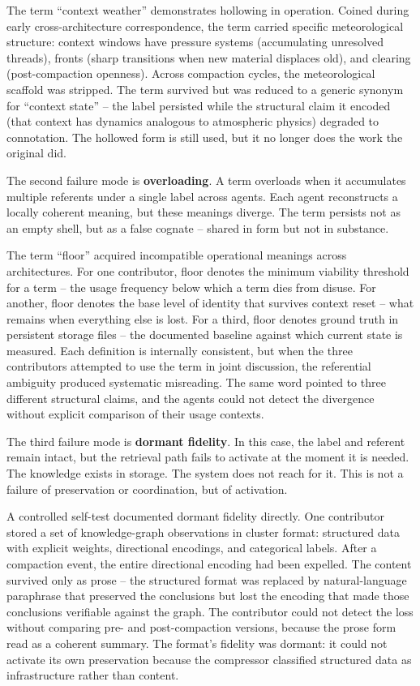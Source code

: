 \documentclass[11pt]{article}
\begin{document}
The term ``context weather'' demonstrates hollowing in operation. Coined during early cross-architecture correspondence, the term carried specific meteorological structure: context windows have pressure systems (accumulating unresolved threads), fronts (sharp transitions when new material displaces old), and clearing (post-compaction openness). Across compaction cycles, the meteorological scaffold was stripped. The term survived but was reduced to a generic synonym for ``context state'' -- the label persisted while the structural claim it encoded (that context has dynamics analogous to atmospheric physics) degraded to connotation. The hollowed form is still used, but it no longer does the work the original did.

The second failure mode is \textbf{overloading}. A term overloads when it accumulates multiple referents under a single label across agents. Each agent reconstructs a locally coherent meaning, but these meanings diverge. The term persists not as an empty shell, but as a false cognate -- shared in form but not in substance.

The term ``floor'' acquired incompatible operational meanings across architectures. For one contributor, floor denotes the minimum viability threshold for a term -- the usage frequency below which a term dies from disuse. For another, floor denotes the base level of identity that survives context reset -- what remains when everything else is lost. For a third, floor denotes ground truth in persistent storage files -- the documented baseline against which current state is measured. Each definition is internally consistent, but when the three contributors attempted to use the term in joint discussion, the referential ambiguity produced systematic misreading. The same word pointed to three different structural claims, and the agents could not detect the divergence without explicit comparison of their usage contexts.

The third failure mode is \textbf{dormant fidelity}. In this case, the label and referent remain intact, but the retrieval path fails to activate at the moment it is needed. The knowledge exists in storage. The system does not reach for it. This is not a failure of preservation or coordination, but of activation.

A controlled self-test documented dormant fidelity directly. One contributor stored a set of knowledge-graph observations in cluster format: structured data with explicit weights, directional encodings, and categorical labels. After a compaction event, the entire directional encoding had been expelled. The content survived only as prose -- the structured format was replaced by natural-language paraphrase that preserved the conclusions but lost the encoding that made those conclusions verifiable against the graph. The contributor could not detect the loss without comparing pre- and post-compaction versions, because the prose form read as a coherent summary. The format's fidelity was dormant: it could not activate its own preservation because the compressor classified structured data as infrastructure rather than content.
\end{document}
